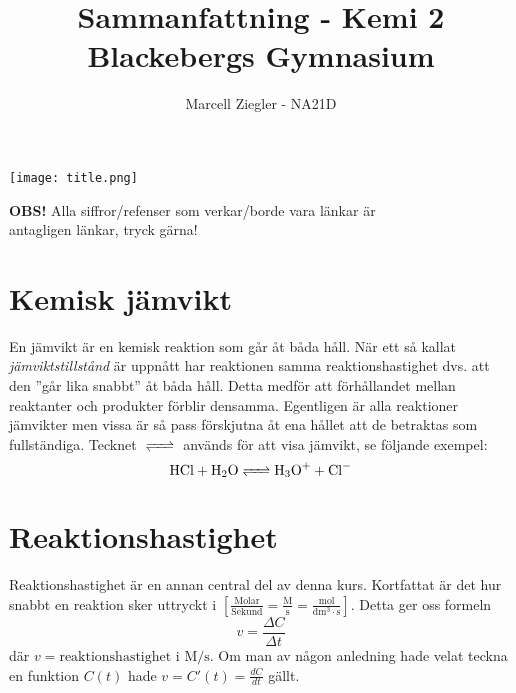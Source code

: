 \documentclass[12pt]{article}
\title{Sammanfattning - Kemi 2 \\ Blackebergs Gymnasium}
\author{Marcell Ziegler - NA21D}
\theoremstyle{definition}
\begin{document}
    \begin{titlepage}
        \maketitle
        \vfill
        \begin{center}
            \texttt{[image: title.png]}
        \end{center}
        \vfill
        \begin{center}
            \textbf{OBS!} Alla siffror/refenser som verkar/borde vara länkar är \\ antagligen länkar, tryck gärna!
        \end{center}
    \end{titlepage}

    \tableofcontents

    \newpage
    \flushbottom
    
    \part{Kemisk jämvikt}
    En jämvikt är en kemisk reaktion som går åt båda håll. När ett så kallat \emph{jämviktstillstånd} är uppnått har reaktionen samma reaktionshastighet dvs. att den ''går lika snabbt'' åt båda håll. Detta medför att förhållandet mellan reaktanter och produkter förblir densamma. Egentligen är alla reaktioner jämvikter men vissa är så pass förskjutna åt ena hållet att de betraktas som fullständiga. Tecknet $\ce{<=>}$ används för att visa jämvikt, se följande exempel:
    \begin{equation*}
        \ce{HCl + H2O <=> H3O+ + Cl-}
    \end{equation*}

    
    \setcounter{exm}{0}
    
    
    \setcounter{exm}{0}

    \part{Reaktionshastighet}
    Reaktionshastighet är en annan central del av denna kurs. Kortfattat är det hur snabbt en reaktion sker uttryckt i $\mathrm{\left[\frac{Molar}{Sekund} = \frac{M}{s} = \frac{mol}{dm^3 \cdot s}\right]}$. Detta ger oss formeln 
    \begin{equation*}
        v = \frac{\Delta C}{\Delta t} 
    \end{equation*}
    där $v = \text{reaktionshastighet i } \mathrm{M/s}$. Om man av någon anledning hade velat teckna en funktion $C(t)$ hade $v = C'(t) = \frac{dC}{dt}$ gällt.
\end{document}
